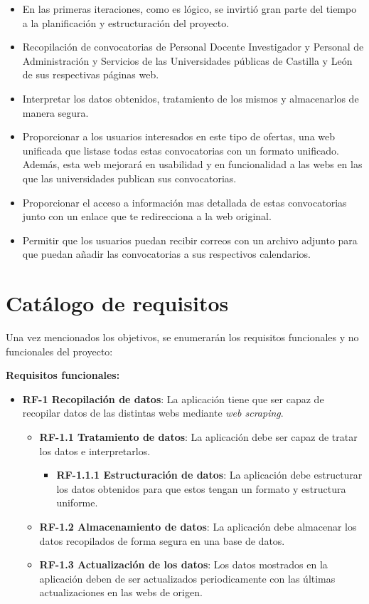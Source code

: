 \begin{itemize}
\item En las primeras iteraciones, como es lógico, se invirtió gran parte del tiempo a la planificación y estructuración del proyecto.

\item Recopilación de convocatorias de Personal Docente Investigador y Personal de Administración y Servicios de las Universidades públicas de Castilla y León de sus respectivas páginas web. 

\item Interpretar los datos obtenidos, tratamiento de los mismos y almacenarlos de manera segura.

\item Proporcionar a los usuarios interesados en este tipo de ofertas, una web unificada que listase todas estas convocatorias con un formato unificado. Además, esta web mejorará en usabilidad y en funcionalidad a las webs en las que las universidades publican sus convocatorias.

\item Proporcionar el acceso a información mas detallada de estas convocatorias junto con un enlace que te redirecciona a la web original.

\item Permitir que los usuarios puedan recibir correos con un archivo adjunto para que puedan añadir las convocatorias a sus respectivos calendarios.

\end{itemize}

\section{Catálogo de requisitos}

Una vez mencionados los objetivos, se enumerarán los requisitos funcionales y no funcionales del proyecto:

\textbf{Requisitos funcionales:}

\begin{itemize}
\item\textbf{RF-1 Recopilación de datos}: La aplicación tiene que ser capaz de recopilar datos de las distintas webs mediante \textit{web scraping}.
\begin{itemize}
\item\textbf{RF-1.1 Tratamiento de datos}: La aplicación debe ser capaz de tratar los datos e interpretarlos.
\begin{itemize}
\item\textbf{RF-1.1.1 Estructuración de datos}: La aplicación debe estructurar los datos obtenidos para que estos tengan un formato y estructura uniforme.
\end{itemize}
\item\textbf{RF-1.2 Almacenamiento de datos}: La aplicación debe almacenar los datos recopilados de forma segura en una base de datos.
\item\textbf{RF-1.3 Actualización de los datos}: Los datos mostrados en la aplicación deben de ser actualizados periodicamente con las últimas actualizaciones en las webs de origen.
\end{itemize}
\end{itemize}

